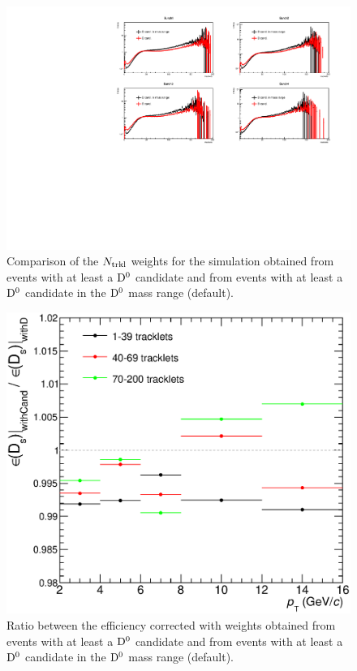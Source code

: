 \begin{figure}[htpb]
\centering
 \includegraphics[width=.9\textwidth]{FigCap6/NtrkWeightsD-Cand_4Bunches_DsDplusVsmult.pdf}
 \caption{Comparison of the $N_{\rm trkl}$ weights for the simulation obtained from events with at least a ${\rm D^0}$ candidate and from events with at least a ${\rm D^0}$ candidate in the ${\rm D^0}$ mass range (default).}
 \label{fig:NtrklWeights_EvWithD_EvWithCand_Comparison}
\end{figure}


\begin{figure}[htpb]
\centering
 \includegraphics[width=.49\textwidth]{FigCap6/SystOnDWeightsWithCandVsWithD_Dsonly.eps}
 \caption{Ratio between the efficiency corrected with weights obtained from events with at least a ${\rm D^0}$ candidate and from events with at least a ${\rm D^0}$ candidate in the ${\rm D^0}$ mass range (default).}
 \label{fig:DsDplusVsMult_SystEffWeights}
\end{figure}




